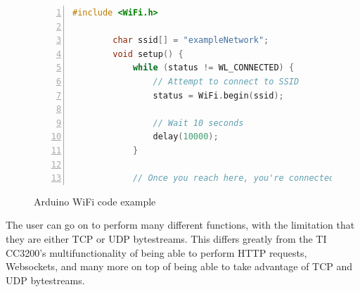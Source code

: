 \begin{figure}[hbtp]
    \caption{Arduino WiFi code example}
    \label{fig:arduino_wifi_example}
    \begin{lstlisting}[language=c,frame=none,numbers=left,numbersep=-10pt,numberstyle=\tiny,basicstyle=\footnotesize\ttfamily]
        #include <WiFi.h>

        char ssid[] = "exampleNetwork";
        void setup() {
            while (status != WL_CONNECTED) {
                // Attempt to connect to SSID
                status = WiFi.begin(ssid);

                // Wait 10 seconds
                delay(10000);
            }

            // Once you reach here, you're connected
    \end{lstlisting}
\end{figure}

The user can go on to perform many different functions, with the limitation that they are either TCP or UDP bytestreams. This differs greatly from the TI CC3200's multifunctionality of being able to perform HTTP requests, Websockets, and many more on top of being able to take advantage of TCP and UDP bytestreams.